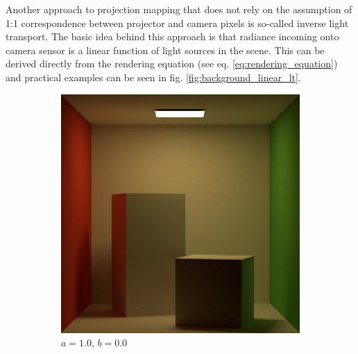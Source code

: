 Another approach to projection mapping that does not rely on the assumption of 1:1 correspondence between projector and camera pixels is so-called inverse light transport. The basic idea behind this approach is that radiance incoming onto camera sensor is a linear function of light sources in the scene. This can be derived directly from the rendering equation (see eq. \ref{eq:rendering_equation}) and practical examples can be seen in fig. \ref{fig:background_linear_lt}.

\begin{figure}[ht]
    \centering
    \begin{subfigure}[b]{0.24\textwidth}
        \centering
        \includegraphics[width=\textwidth]{images/02-linear_lt_light01.jpg}
        \caption*{\(a = 1.0\), \(b = 0.0\)}
    \end{subfigure}
    \hfill
    \begin{subfigure}[b]{0.24\textwidth}
        \centering

\end{subfigure}
\end{figure}
